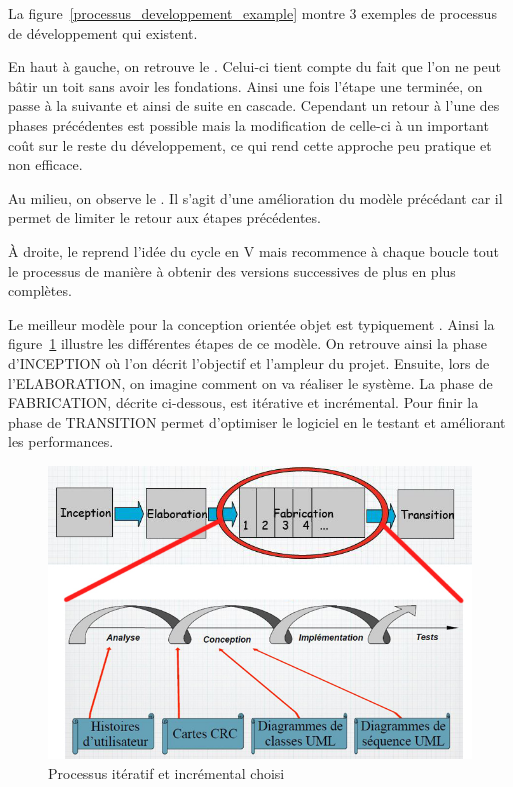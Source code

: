 La figure~\ref{processus_developpement_example}
montre 3 exemples de processus de développement qui existent.

En haut à gauche, on retrouve le .
Celui-ci tient compte du fait que l'on ne peut bâtir
un toit sans avoir les fondations.
Ainsi une fois l'étape une terminée,
on passe à la suivante et ainsi de suite en cascade.
Cependant un retour à l'une des phases précédentes est possible mais
la modification de celle-ci à un important coût sur le reste du développement,
ce qui rend cette approche peu pratique et non efficace.

Au milieu, on observe le .
Il s'agit d'une amélioration du modèle précédant
car il permet de limiter le retour aux étapes précédentes.

À droite, le  reprend l'idée du cycle en V mais
recommence à chaque boucle tout le processus de manière à obtenir
des versions successives de plus en plus complètes.

Le meilleur modèle pour la conception orientée objet est
typiquement .
Ainsi la figure~\ref{processus_developpement_choisi}
illustre les différentes étapes de ce modèle.
On retrouve ainsi la phase d'INCEPTION où l'on
décrit l'objectif et l'ampleur du projet.
Ensuite, lors de l'ELABORATION, on imagine comment on va réaliser le système.
La phase de FABRICATION, décrite ci-dessous, est itérative et incrémental.
Pour finir la phase de TRANSITION permet d'optimiser le logiciel
en le testant et améliorant les performances.
\begin{figure}[h]
  \centering
  \includegraphics[scale=0.65]{processus_developpement_choisi.jpg}
  \caption{Processus itératif et incrémental choisi}
  \label{processus_developpement_choisi}
\end{figure}


